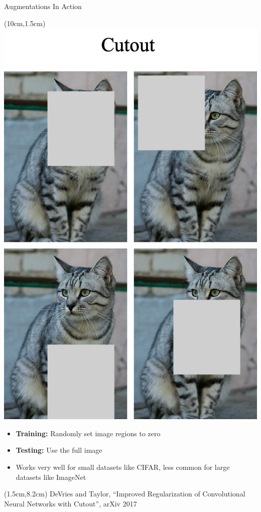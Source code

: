 \documentclass[serif, aspectratio=169]{beamer}
\begin{document}
\begin{frame}{Augmentations In Action}
	\begin{textblock*}{5cm}(10cm,1.5cm) %
		\includegraphics[keepaspectratio, scale=0.18]{pic/cutout}
	\end{textblock*}

	\begin{itemize}
		\item \textbf{Training:} Randomly set image regions to zero
		\item \textbf{Testing:} Use the full image
		\item Works very well for small datasets like CIFAR, less \newline common for large datasets like ImageNet
	\end{itemize}

	\begin{textblock*}{10cm}(1.5cm,8.2cm) %
		\tiny{DeVries and Taylor, ``Improved Regularization of Convolutional
		Neural Networks with Cutout'', arXiv 2017}
	\end{textblock*}
\end{frame}
\end{document}
